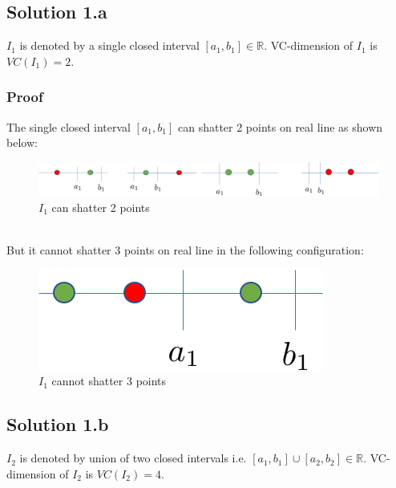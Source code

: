 \subsection*{Solution 1.a}
$I_1$ is denoted by a single closed interval $[a_1, b_1] \in \mathbb{R}$. VC-dimension of $I_1$ is $VC(I_1) = 2$.
\subsubsection*{Proof}
The single closed interval $[a_1, b_1]$ can shatter 2 points on real line as shown below:
\begin{figure}[h!]
	\centering
	\includegraphics[scale=0.5]{q_1_a_augmented}
	\caption{$I_1$ can shatter 2 points}
\end{figure}
\\
But it cannot shatter 3 points on real line in the following configuration:
\begin{figure}[h!]
	\centering
	\includegraphics[scale=0.5]{q1_a_proof}
	\caption{$I_1$ cannot shatter 3 points}
\end{figure}
\subsection*{Solution 1.b}
$I_2$ is denoted by union of two closed intervals i.e. $[a_1, b_1] \cup [a_2, b_2]\in \mathbb{R}$. VC-dimension of $I_2$ is $VC(I_2) = 4$.
